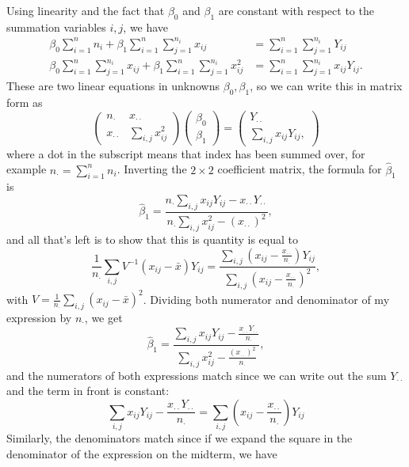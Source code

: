 \documentclass[11pt]{article}
\begin{document}
\begin{enumerate}
\begin{enumerate}
			Using linearity and the fact that $\beta_0$ and $\beta_1$ are constant with respect to the summation variables $i,j$, we have
			\begin{align*}
				\beta_0\sum_{i=1}^n n_i + \beta_1 \sum_{i=1}^n \sum_{j=1}^{n_i} x_{ij} &= \sum_{i=1}^n \sum_{j=1}^{n_i} Y_{ij} \\
				\beta_0\sum_{i=1}^n\sum_{j=1}^{n_i} x_{ij} + \beta_1 \sum_{i=1}^n\sum_{j=1}^{n_i} x_{ij}^2 &= \sum_{i=1}^n \sum_{j=1}^{n_i} x_{ij}Y_{ij}.
			\end{align*}
			These are two linear equations in unknowns $\beta_0,\beta_1$, so we can write this in matrix form as
			\[
				\begin{pmatrix}
					n_\cdot & x_{\cdot\cdot} \\ x_{\cdot\cdot} &\sum_{i,j}x_{ij}^2
				\end{pmatrix}\begin{pmatrix}
				\beta_0 \\ \beta_1
				\end{pmatrix} = \begin{pmatrix}
				Y_{\cdot\cdot} \\ \sum_{i,j} x_{ij}Y_{ij},
				\end{pmatrix}
			\]
			where a dot in the subscript means that index has been summed over, for example $n_\cdot = \sum_{i=1}^n n_i$. Inverting the $2\times 2$ coefficient matrix, the formula for $\widehat{\beta}_1$ is
			\[
				\widehat{\beta}_1 = \frac{n_\cdot \sum_{i,j} x_{ij}Y_{ij} - x_{\cdot\cdot}Y_{\cdot\cdot}}{n_\cdot\sum_{i,j}x_{ij}^2 - (x_{\cdot\cdot})^2},
			\]
			and all that's left is to show that this is quantity is equal to
			\[
				\frac{1}{n_\cdot}\sum_{i,j} V^{-1}(x_{ij}-\bar{x})Y_{ij} = \frac{\sum_{i,j}(x_{ij}-\frac{x_{\cdot\cdot}}{n_\cdot})Y_{ij}}{\sum_{i,j} (x_{ij} - \frac{x_{\cdot\cdot}}{n_\cdot})^2},
			\]
			with $V = \frac{1}{n_\cdot}\sum_{i,j}(x_{ij}-\bar{x})^2$. Dividing both numerator and denominator of my expression by $n_\cdot$, we get
			\[
				\widehat{\beta}_1 = \frac{\sum_{i,j} x_{ij}Y_{ij} - \frac{x_{\cdot\cdot}Y_{\cdot\cdot}}{n_\cdot}}{\sum_{i,j}x_{ij}^2 - \frac{(x_{\cdot\cdot})^2}{n_\cdot}},
			\]
			and the numerators of both expressions match since we can write out the sum $Y_{\cdot\cdot}$ and the term in front is constant:
			\[
				\sum_{i,j} x_{ij}Y_{ij} - \frac{x_{\cdot\cdot}Y_{\cdot\cdot}}{n_\cdot} = \sum_{i,j} (x_{ij} - \frac{x_{\cdot\cdot}}{n_\cdot})Y_{ij}
			\]
			Similarly, the denominators match since if we expand the square in the denominator of the expression on the midterm, we have
			\[
\]
\end{enumerate}
\end{enumerate}
\end{document}

